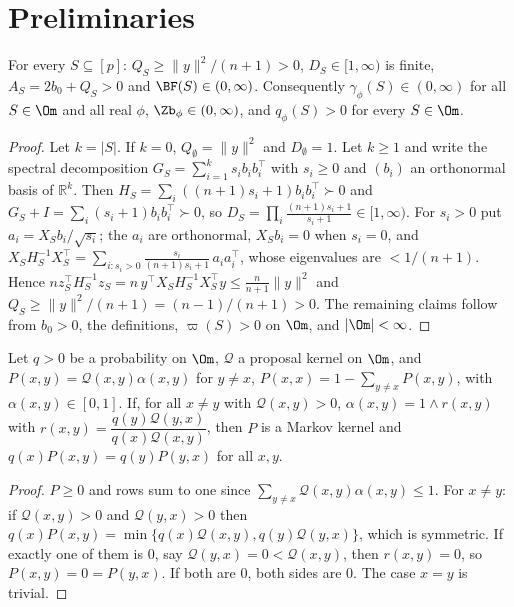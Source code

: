 \documentclass[11pt]{report}
\begin{document}
\section{Preliminaries}

\begin{T09lemma}[Positivity]\label{T09:lem:pos}
For every $S\subseteq[p]$: $Q_S\ge \|y\|^2/(n+1)>0$, $D_S\in[1,\infty)$ is finite, $A_S=2b_0+Q_S>0$ and $\BF(S)\in(0,\infty)$. Consequently $\gamma_\phi(S)\in(0,\infty)$ for all $S\in\Om$ and all real $\phi$, $\Zb_\phi\in(0,\infty)$, and $q_\phi(S)>0$ for every $S\in\Om$.
\end{T09lemma}
\begin{proof}
Let $k=|S|$. If $k=0$, $Q_\emptyset=\|y\|^2$ and $D_\emptyset=1$. Let $k\ge1$ and write the spectral decomposition $G_S=\sum_{i=1}^k s_i b_ib_i^\top$ with $s_i\ge0$ and $(b_i)$ an orthonormal basis of $\mathbb R^k$. Then $H_S=\sum_i((n+1)s_i+1)b_ib_i^\top\succ0$ and $G_S+I=\sum_i(s_i+1)b_ib_i^\top\succ0$, so $D_S=\prod_i\frac{(n+1)s_i+1}{s_i+1}\in[1,\infty)$. For $s_i>0$ put $a_i=X_Sb_i/\sqrt{s_i}$; the $a_i$ are orthonormal, $X_Sb_i=0$ when $s_i=0$, and
$X_SH_S^{-1}X_S^\top=\sum_{i:s_i>0}\frac{s_i}{(n+1)s_i+1}\,a_ia_i^\top$, whose eigenvalues are $<1/(n+1)$. Hence $n z_S^\top H_S^{-1}z_S=n\,y^\top X_SH_S^{-1}X_S^\top y\le \frac{n}{n+1}\|y\|^2$ and $Q_S\ge\|y\|^2/(n+1)=(n-1)/(n+1)>0$. The remaining claims follow from $b_0>0$, the definitions, $\varpi(S)>0$ on $\Om$, and $|\Om|<\infty$.
\end{proof}

\begin{T09lemma}\label{T09:lem:mh}
Let $q>0$ be a probability on $\Om$, $\mathcal Q$ a proposal kernel on $\Om$, and $P(x,y)=\mathcal Q(x,y)\alpha(x,y)$ for $y\ne x$, $P(x,x)=1-\sum_{y\ne x}P(x,y)$, with $\alpha(x,y)\in[0,1]$. If, for all $x\neq y$ with $\mathcal Q(x,y)>0$,
$\alpha(x,y)=1\wedge r(x,y)$ with $r(x,y)=\dfrac{q(y)\mathcal Q(y,x)}{q(x)\mathcal Q(x,y)}$, then $P$ is a Markov kernel and $q(x)P(x,y)=q(y)P(y,x)$ for all $x,y$.
\end{T09lemma}
\begin{proof}
$P\ge0$ and rows sum to one since $\sum_{y\ne x}\mathcal Q(x,y)\alpha(x,y)\le1$. For $x\ne y$: if $\mathcal Q(x,y)>0$ and $\mathcal Q(y,x)>0$ then $q(x)P(x,y)=\min\{q(x)\mathcal Q(x,y),q(y)\mathcal Q(y,x)\}$, which is symmetric. If exactly one of them is $0$, say $\mathcal Q(y,x)=0<\mathcal Q(x,y)$, then $r(x,y)=0$, so $P(x,y)=0=P(y,x)$. If both are $0$, both sides are $0$. The case $x=y$ is trivial.
\end{proof}
\end{document}
